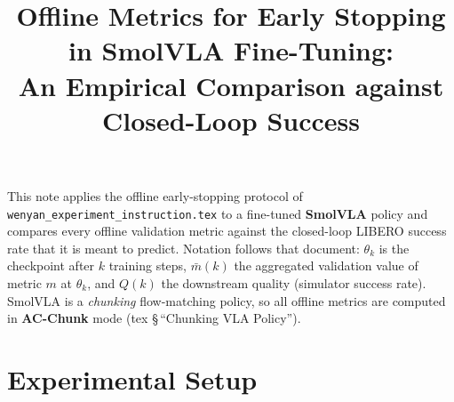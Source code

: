 \documentclass[11pt]{article}
\title{Offline Metrics for Early Stopping in SmolVLA Fine-Tuning:\\
An Empirical Comparison against Closed-Loop Success}
\author{}
\date{}
\begin{document}
\maketitle

This note applies the offline early-stopping protocol of
\texttt{wenyan\_experiment\_instruction.tex} to a fine-tuned \textbf{SmolVLA} policy and compares
every offline validation metric against the closed-loop LIBERO success rate that it is meant to
predict. Notation follows that document: $\theta_k$ is the checkpoint after $k$ training steps,
$\bar m(k)$ the aggregated validation value of metric $m$ at $\theta_k$, and $Q(k)$ the downstream
quality (simulator success rate). SmolVLA is a \emph{chunking} flow-matching policy, so all offline
metrics are computed in \textbf{AC-Chunk} mode (tex \S\,``Chunking VLA Policy'').

\section{Experimental Setup}
\end{document}
